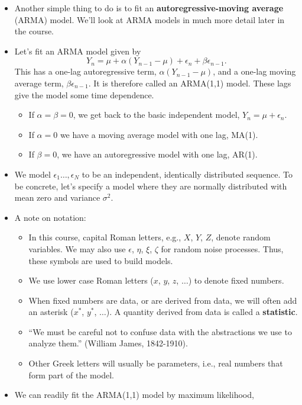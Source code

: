 \documentclass[]{article}
\begin{document}
\begin{itemize}
\item
  Another simple thing to do is to fit an \textbf{autoregressive-moving
  average} (ARMA) model. We'll look at ARMA models in much more detail
  later in the course.
\item
  Let's fit an ARMA model given by
  \[ Y_n = \mu + \alpha(Y_{n-1}-\mu) + \epsilon_n + \beta \epsilon_{n-1}.\]
  This has a one-lag autoregressive term, \(\alpha(Y_{n-1}-\mu)\), and a
  one-lag moving average term, \(\beta \epsilon_{n-1}\). It is therefore
  called an ARMA(1,1) model. These lags give the model some time
  dependence.

  \begin{itemize}
  \item
    If \(\alpha=\beta=0\), we get back to the basic independent model,
    \(Y_n = \mu + \epsilon_n\).
  \item
    If \(\alpha=0\) we have a moving average model with one lag, MA(1).
  \item
    If \(\beta=0\), we have an autoregressive model with one lag, AR(1).
  \end{itemize}
\item
  We model \(\epsilon_1\dots,\epsilon_N\) to be an independent,
  identically distributed sequence. To be concrete, let's specify a
  model where they are normally distributed with mean zero and variance
  \(\sigma^2\).
\item
  A note on notation:

  \begin{itemize}
  \item
    In this course, capital Roman letters, e.g., \(X\), \(Y\), \(Z\),
    denote random variables. We may also use \(\epsilon\), \(\eta\),
    \(\xi\), \(\zeta\) for random noise processes. Thus, these symbols
    are used to build models.
  \item
    We use lower case Roman letters (\(x\), \(y\), \(z\), \(\dots\)) to
    denote fixed numbers.
  \item
    When fixed numbers are data, or are derived from data, we will often
    add an asterisk (\(x^*\), \(y^*\), \(\dots\)). A quantity derived
    from data is called a \textbf{statistic}.
  \item
    ``We must be careful not to confuse data with the abstractions we
    use to analyze them.'' (William James, 1842-1910).
  \item
    Other Greek letters will usually be parameters, i.e., real numbers
    that form part of the model.
  \end{itemize}
\item
  We can readily fit the ARMA(1,1) model by maximum likelihood,
\end{itemize}
\end{document}
